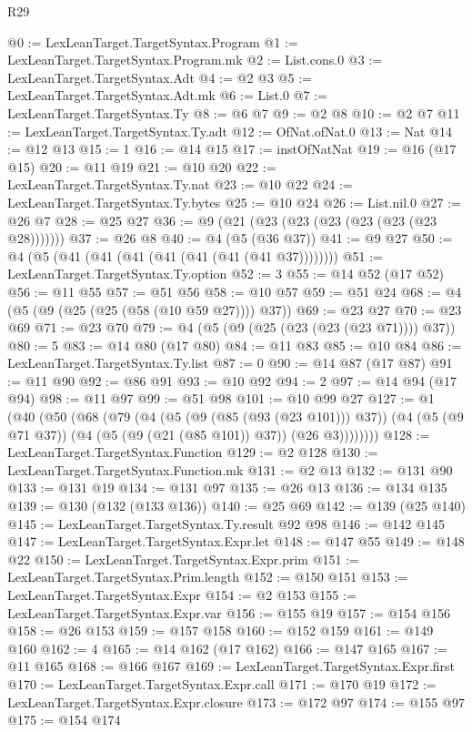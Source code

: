 \begin{lexlean}{R29}
\begin{coremodule}
@0 := LexLeanTarget.TargetSyntax.Program
@1 := LexLeanTarget.TargetSyntax.Program.mk
@2 := List.cons.{0}
@3 := LexLeanTarget.TargetSyntax.Adt
@4 := @2 @3
@5 := LexLeanTarget.TargetSyntax.Adt.mk
@6 := List.{0}
@7 := LexLeanTarget.TargetSyntax.Ty
@8 := @6 @7
@9 := @2 @8
@10 := @2 @7
@11 := LexLeanTarget.TargetSyntax.Ty.adt
@12 := OfNat.ofNat.{0}
@13 := Nat
@14 := @12 @13
@15 := 1
@16 := @14 @15
@17 := instOfNatNat
@19 := @16 (@17 @15)
@20 := @11 @19
@21 := @10 @20
@22 := LexLeanTarget.TargetSyntax.Ty.nat
@23 := @10 @22
@24 := LexLeanTarget.TargetSyntax.Ty.bytes
@25 := @10 @24
@26 := List.nil.{0}
@27 := @26 @7
@28 := @25 @27
@36 := @9 (@21 (@23 (@23 (@23 (@23 (@23 (@23 @28)))))))
@37 := @26 @8
@40 := @4 (@5 (@36 @37))
@41 := @9 @27
@50 := @4 (@5 (@41 (@41 (@41 (@41 (@41 (@41 (@41 @37))))))))
@51 := LexLeanTarget.TargetSyntax.Ty.option
@52 := 3
@55 := @14 @52 (@17 @52)
@56 := @11 @55
@57 := @51 @56
@58 := @10 @57
@59 := @51 @24
@68 := @4 (@5 (@9 (@25 (@25 (@58 (@10 @59 @27)))) @37))
@69 := @23 @27
@70 := @23 @69
@71 := @23 @70
@79 := @4 (@5 (@9 (@25 (@23 (@23 (@23 @71)))) @37))
@80 := 5
@83 := @14 @80 (@17 @80)
@84 := @11 @83
@85 := @10 @84
@86 := LexLeanTarget.TargetSyntax.Ty.list
@87 := 0
@90 := @14 @87 (@17 @87)
@91 := @11 @90
@92 := @86 @91
@93 := @10 @92
@94 := 2
@97 := @14 @94 (@17 @94)
@98 := @11 @97
@99 := @51 @98
@101 := @10 @99 @27
@127 := @1
    (@40
      (@50
        (@68
          (@79
            (@4
              (@5 (@9 (@85 (@93 (@23 @101))) @37))
              (@4 (@5 (@9 @71 @37)) (@4 (@5 (@9 (@21 (@85 @101)) @37)) (@26 @3))))))))
@128 := LexLeanTarget.TargetSyntax.Function
@129 := @2 @128
@130 := LexLeanTarget.TargetSyntax.Function.mk
@131 := @2 @13
@132 := @131 @90
@133 := @131 @19
@134 := @131 @97
@135 := @26 @13
@136 := @134 @135
@139 := @130 (@132 (@133 @136))
@140 := @25 @69
@142 := @139 (@25 @140)
@145 := LexLeanTarget.TargetSyntax.Ty.result @92 @98
@146 := @142 @145
@147 := LexLeanTarget.TargetSyntax.Expr.let
@148 := @147 @55
@149 := @148 @22
@150 := LexLeanTarget.TargetSyntax.Expr.prim
@151 := LexLeanTarget.TargetSyntax.Prim.length
@152 := @150 @151
@153 := LexLeanTarget.TargetSyntax.Expr
@154 := @2 @153
@155 := LexLeanTarget.TargetSyntax.Expr.var
@156 := @155 @19
@157 := @154 @156
@158 := @26 @153
@159 := @157 @158
@160 := @152 @159
@161 := @149 @160
@162 := 4
@165 := @14 @162 (@17 @162)
@166 := @147 @165
@167 := @11 @165
@168 := @166 @167
@169 := LexLeanTarget.TargetSyntax.Expr.first
@170 := LexLeanTarget.TargetSyntax.Expr.call
@171 := @170 @19
@172 := LexLeanTarget.TargetSyntax.Expr.closure
@173 := @172 @97
@174 := @155 @97
@175 := @154 @174

\end{coremodule}
\end{lexlean}
